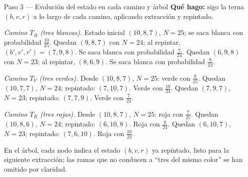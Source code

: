 \documentclass[11pt]{article}
\begin{document}
\begin{paso}{Paso 3 --- Evolución del estado en cada camino y árbol}
\textbf{Qué hago:} sigo la terna $(b,v,r)$ a lo largo de cada camino, aplicando extracción y repintado.

\emph{Camino $T_B$ (tres blancas).} Estado inicial $(10,8,7)$, $N=25$; se saca blanca con probabilidad $\tfrac{10}{25}$. Quedan $(9,8,7)$ con $N=24$; al repintar, $(b',v',r')=(7,9,8)$. Se saca blanca con probabilidad $\tfrac{7}{24}$. Quedan $(6,9,8)$ con $N=23$; al repintar, $(8,6,9)$. Se saca blanca con probabilidad $\tfrac{8}{23}$.

\emph{Camino $T_V$ (tres verdes).} Desde $(10,8,7)$, $N=25$: verde con $\tfrac{8}{25}$. Quedan $(10,7,7)$, $N=24$; repintado: $(7,10,7)$. Verde con $\tfrac{10}{24}$. Quedan $(7,9,7)$, $N=23$; repintado: $(7,7,9)$. Verde con $\tfrac{7}{23}$.

\emph{Camino $T_R$ (tres rojas).} Desde $(10,8,7)$, $N=25$: roja con $\tfrac{7}{25}$. Quedan $(10,8,6)$, $N=24$; repintado: $(6,10,8)$. Roja con $\tfrac{8}{24}$. Quedan $(6,10,7)$, $N=23$; repintado: $(7,6,10)$. Roja con $\tfrac{10}{23}$.

\begin{center}
\end{center}

En el árbol, cada nodo indica el estado $(b,v,r)$ ya repintado, listo para la siguiente extracción; las ramas que no conducen a ``tres del mismo color'' se han omitido por claridad.


\end{paso}
\end{document}
